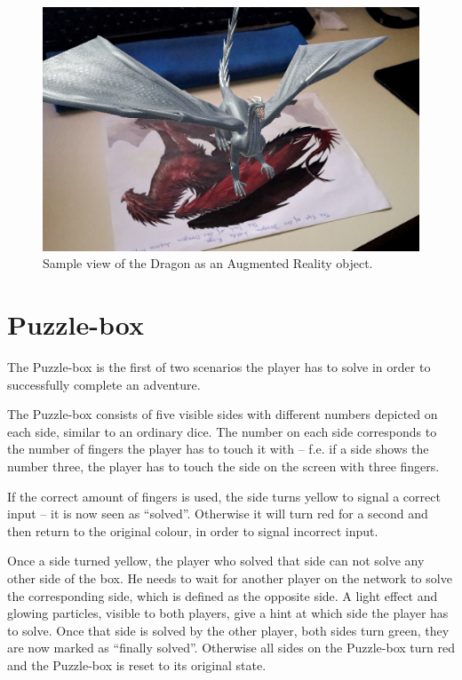\documentclass{sigchi-ext}
\begin{document}
\begin{figure}
	\centering
	\includegraphics[width=1\columnwidth]{figures/PM_AR_Dragon}
	\caption{Sample view of the Dragon as an Augmented Reality object.}\label{fig:AR_Dragon1}
\end{figure}

\section{Puzzle-box}

The Puzzle-box is the first of two scenarios the player has to solve in order to successfully complete an adventure.

The Puzzle-box consists of five visible sides with different numbers depicted on each side, similar to an ordinary dice. The number on each side corresponds to the number of fingers the player has to touch it with -- f.e. if a side shows the number three, the player has to touch the side on the screen with three fingers.

If the correct amount of fingers is used, the side turns yellow to signal a correct input -- it is now seen as ``solved''. Otherwise it will turn red for a second and then return to the original colour, in order to signal incorrect input.

Once a side turned yellow, the player who solved that side can not solve any other side of the box. He needs to wait for another player on the network to solve the corresponding side, which is defined as the opposite side. A light effect and glowing particles, visible to both players, give a hint at which side the player has to solve. Once that side is solved by the other player, both sides turn green, they are now marked as ``finally solved''. Otherwise all sides on the Puzzle-box turn red and the Puzzle-box is reset to its original state.
\end{document}
